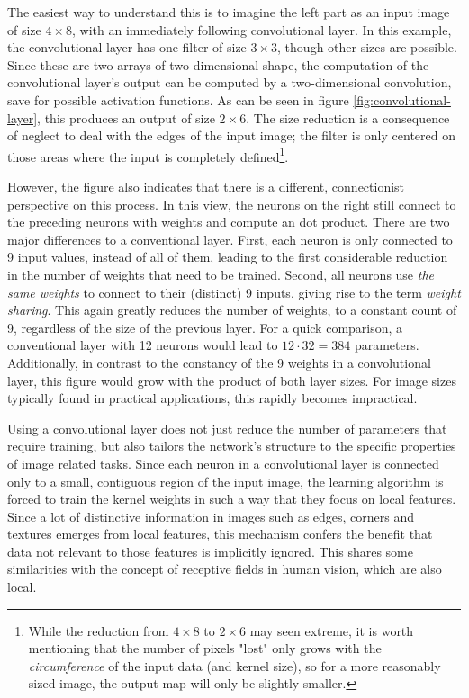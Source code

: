 \documentclass[11pt, a4paper]{article}
\begin{document}
The easiest way to understand this is to imagine the left part as an input image of size $4 \times 8$, with an immediately following convolutional layer. In this example, the convolutional layer has one filter of size $3 \times 3$, though other sizes are possible. Since these are two arrays of two-dimensional shape, the computation of the convolutional layer's output can be computed by a two-dimensional convolution, save for possible activation functions. As can be seen in figure \ref{fig:convolutional-layer}, this produces an output of size $2 \times 6$. The size reduction is a consequence of neglect to deal with the edges of the input image; the filter is only centered on those areas where the input is completely defined\footnote{While the reduction from $4 \times 8$ to $2 \times 6$ may seen extreme, it is worth mentioning that the number of pixels "lost" only grows with the \emph{circumference} of the input data (and kernel size), so for a more reasonably sized image, the output map will only be slightly smaller.}.

However, the figure also indicates that there is a different, connectionist perspective on this process. In this view, the neurons on the right still connect to the preceding neurons with weights and compute an dot product. There are two major differences to a conventional layer. First, each neuron is only connected to 9 input values, instead of all of them, leading to the first considerable reduction in the number of weights that need to be trained. Second, all neurons use \emph{the same weights} to connect to their (distinct) 9 inputs, giving rise to the term \emph{weight sharing}. This again greatly reduces the number of weights, to a constant count of 9, regardless of the size of the previous layer. For a quick comparison, a conventional layer with 12 neurons would lead to $12 \cdot 32 = 384$ parameters. Additionally, in contrast to the constancy of the 9 weights in a convolutional layer, this figure would grow with the product of both layer sizes. For image sizes typically found in practical applications, this rapidly becomes impractical.

Using a convolutional layer does not just reduce the number of parameters that require training, but also tailors the network's structure to the specific properties of image related tasks. Since each neuron in a convolutional layer is connected only to a small, contiguous region of the input image, the learning algorithm is forced to train the kernel weights in such a way that they focus on local features. Since a lot of distinctive information in images such as edges, corners and textures emerges from local features, this mechanism confers the benefit that data not relevant to those features is implicitly ignored. This shares some similarities with the concept of receptive fields in human vision, which are also local.
\end{document}
